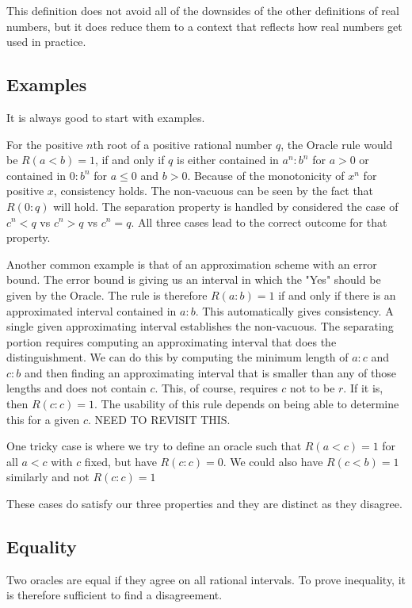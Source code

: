 \documentclass[12pt]{article}
\begin{document}
This definition does not avoid all of the downsides of the other definitions of real numbers, but it does reduce them to a context that reflects how real numbers get used in practice. 


\subsection{Examples}

It is always good to start with examples. 

For the positive $n$th root of a positive rational number $q$, the Oracle rule would be $R(a<b) = 1$, if and only if $q$ is either contained in $a^n:b^n$ for $a>0$ or contained in $0:b^n$ for $a \leq 0$ and $b>0$. Because of the monotonicity of $x^n$ for positive $x$, consistency holds. The non-vacuous can be seen by the fact that $R(0:q)$ will hold. The separation property is handled by considered the case of $c^n < q$ vs $c^n > q$ vs $c^n = q$. All three cases lead to the correct outcome for that property. 

Another common example is that of an approximation scheme with an error bound. The error bound is giving us an interval in which the "Yes" should be given by the Oracle. The rule is therefore $R(a:b) = 1$ if and only if there is an approximated interval contained in $a:b$. This automatically gives consistency. A single given approximating interval establishes the non-vacuous. The separating portion requires computing an approximating interval that does the distinguishment. We can do this by computing the minimum length of $a:c$ and $c:b$ and then finding an approximating interval that is smaller than any of those lengths and does not contain $c$. This, of course, requires $c$ not to be $r$. If it is, then $R(c:c) = 1$. The usability of this rule depends on being able to determine this for a given $c$. NEED TO REVISIT THIS. 

One tricky case is where we try to define an oracle such that $R(a<c) = 1$ for all $a < c$ with $c$ fixed, but have $R(c:c) = 0$. We could also have $R(c<b) =1$ similarly and not $R(c:c) =1$

These cases do satisfy our three properties and they are distinct as they disagree. 

\subsection{Equality}

Two oracles are equal if they agree on all rational intervals. To prove inequality, it is therefore sufficient to find a disagreement. 
\end{document}
